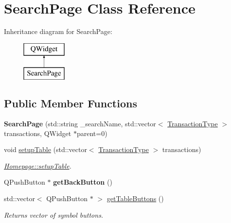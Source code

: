 \hypertarget{class_search_page}{}\section{Search\+Page Class Reference}
\label{class_search_page}
Inheritance diagram for Search\+Page\+:\begin{figure}[H]
\begin{center}
\leavevmode
\includegraphics[height=2.000000cm]{class_search_page}
\end{center}
\end{figure}
\subsection*{Public Member Functions}
\begin{DoxyCompactItemize}
\item 
\mbox{\label{class_search_page_abeaa3ac348ff203b7e4614057c8146c4}} 
{\bfseries Search\+Page} (std\+::string \+\_\+search\+Name, std\+::vector$<$ \mbox{\hyperlink{class_transaction_type}{Transaction\+Type}} $>$ transactions, Q\+Widget $\ast$parent=0)
\item 
void \mbox{\hyperlink{class_search_page_a8024cd843289818a76595fc45e473cb2}{setup\+Table}} (std\+::vector$<$ \mbox{\hyperlink{class_transaction_type}{Transaction\+Type}} $>$ transactions)
\begin{DoxyCompactList}\small\item\em \mbox{\hyperlink{class_homepage_a8eeedb7e3e7b6144d7878e9525aad0ab}{Homepage\+::setup\+Table}}. \end{DoxyCompactList}\item 
\mbox{\label{class_search_page_ab2a390f3c4b0059c8e51819589c76419}} 
Q\+Push\+Button $\ast$ {\bfseries get\+Back\+Button} ()
\item 
\mbox{\label{class_search_page_af059cb331d8eb874068ebac5fb3e97b9}} 
std\+::vector$<$ Q\+Push\+Button $\ast$ $>$ \mbox{\hyperlink{class_search_page_af059cb331d8eb874068ebac5fb3e97b9}{get\+Table\+Buttons}} ()
\begin{DoxyCompactList}\small\item\em Returns vector of symbol buttons. \end{DoxyCompactList}\end{DoxyCompactItemize}


